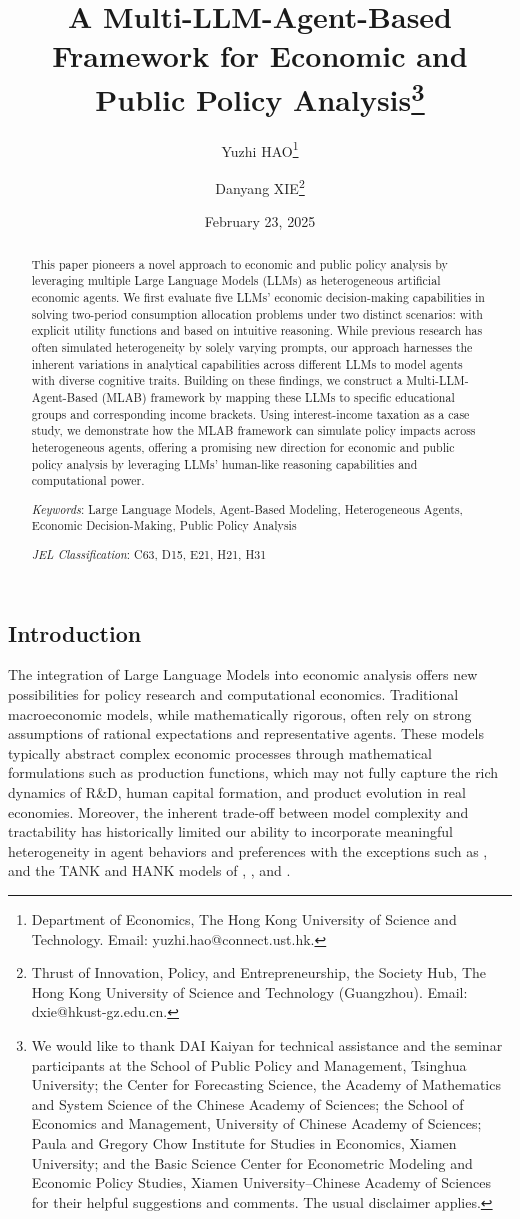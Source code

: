 \documentclass[12pt]{article}
\title{A Multi-LLM-Agent-Based Framework for Economic and Public Policy Analysis\footnote{We would like to thank DAI Kaiyan for technical assistance and the seminar participants at the School of Public Policy and Management, Tsinghua University; the Center for Forecasting Science, the Academy of Mathematics and System Science of the Chinese Academy of Sciences; the School of Economics and Management, University of Chinese Academy of Sciences; Paula and Gregory Chow Institute for Studies in Economics, Xiamen University; and the Basic Science Center for Econometric Modeling and Economic Policy Studies, Xiamen University–Chinese Academy of Sciences for their helpful suggestions and comments. The usual disclaimer applies.}}
\author{Yuzhi HAO\thanks{Department of Economics, The Hong Kong University of Science and Technology. Email: yuzhi.hao@connect.ust.hk.} \and Danyang XIE\thanks{Thrust of Innovation, Policy, and Entrepreneurship, the Society Hub, The Hong Kong University of Science and Technology (Guangzhou). Email: dxie@hkust-gz.edu.cn.}}
\date{February 23, 2025}
\begin{document}
\begin{CJK*}{UTF8}{gbsn} 
\thispagestyle{empty}  

\maketitle
\begin{minipage}{0.96\textwidth}
\begin{abstract}
This paper pioneers a novel approach to economic and public policy analysis by leveraging multiple Large Language Models (LLMs) as heterogeneous artificial economic agents. We first evaluate five LLMs' economic decision-making capabilities in solving two-period consumption allocation problems under two distinct scenarios: with explicit utility functions and based on intuitive reasoning. While previous research has often simulated heterogeneity by solely varying prompts, our approach harnesses the inherent variations in analytical capabilities across different LLMs to model agents with diverse cognitive traits. Building on these findings, we construct a Multi-LLM-Agent-Based (MLAB) framework by mapping these LLMs to specific educational groups and corresponding income brackets. Using interest-income taxation as a case study, we demonstrate how the MLAB framework can simulate policy impacts across heterogeneous agents, offering a promising new direction for economic and public policy analysis by leveraging LLMs' human-like reasoning capabilities and computational power.

\textit{Keywords}: Large Language Models, Agent-Based Modeling, Heterogeneous Agents, Economic Decision-Making, Public Policy Analysis

\textit{JEL Classification}: C63, D15, E21, H21, H31

\end{abstract}   
\end{minipage}
\restoregeometry
\newpage  
\section{Introduction}

The integration of Large Language Models into economic analysis offers new possibilities for policy research and computational economics. Traditional macroeconomic models, while mathematically rigorous, often rely on strong assumptions of rational expectations and representative agents. These models typically abstract complex economic processes through mathematical formulations such as production functions, which may not fully capture the rich dynamics of R\&D, human capital formation, and product evolution in real economies. Moreover, the inherent trade-off between model complexity and tractability has historically limited our ability to incorporate meaningful heterogeneity in agent behaviors and preferences with the exceptions such as \cite{aiyagari1994uninsured}, \cite{krusell1998income} and the TANK and HANK models of \cite{gali2004rule}, \cite{bilbiie2008limited}, and \cite{kaplan2018monetary}.


\end{CJK*}
\end{document}
